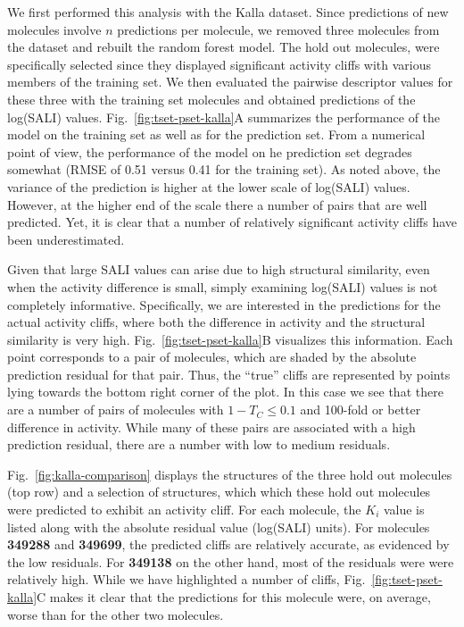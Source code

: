 \documentclass[letterpaper, 12pt]{article}
\begin{document}
We first performed this analysis with the Kalla dataset. Since predictions of new molecules involve
$n$ predictions per molecule, we removed three molecules from the dataset and rebuilt the random
forest model. The hold out molecules, were specifically selected since they displayed significant
activity cliffs with various members of the training set. We then evaluated the pairwise descriptor
values for these three with the training set molecules and obtained predictions of the log(SALI)
values. Fig.~\ref{fig:tset-pset-kalla}A summarizes the performance of the model on the training set
as well as for the prediction set. From a numerical point of view, the performance of the model on
he prediction set degrades somewhat (RMSE of 0.51 versus 0.41 for the training set). As noted above,
the variance of the prediction is higher at the lower scale of log(SALI) values. However, at the
higher end of the scale there a number of pairs that are well predicted. Yet, it is clear that a
number of relatively significant activity cliffs have been underestimated.

Given that large SALI values can arise due to high structural similarity, even when the activity
difference is small, simply examining log(SALI) values is not completely informative. Specifically,
we are interested in the predictions for the actual activity cliffs, where both the difference in
activity and the structural similarity is very high. Fig.~\ref{fig:tset-pset-kalla}B visualizes this
information. Each point corresponds to a pair of molecules, which are shaded by the absolute
prediction residual for that pair. Thus, the ``true'' cliffs are represented by points lying towards
the bottom right corner of the plot. In this case we see that there are a number of pairs of
molecules with $1 - T_C \leq 0.1$ and 100-fold or better difference in activity. While many of these
pairs are associated with a high prediction residual, there are a number with low to medium
residuals.
  
Fig.~\ref{fig:kalla-comparison} displays the structures of the three hold out molecules (top row)
and a selection of structures, which which these hold out molecules were predicted to exhibit an
activity cliff. For each molecule, the $K_i$ value is listed along with the absolute residual value
(log(SALI) units). For molecules \textbf{349288} and \textbf{349699}, the predicted cliffs are
relatively accurate, as evidenced by the low residuals. For \textbf{349138} on the other hand, most
of the residuals were were relatively high. While we have highlighted a number of cliffs,
Fig.~\ref{fig:tset-pset-kalla}C makes it clear that the predictions for this molecule were, on
average, worse than for the other two molecules.
\end{document}
